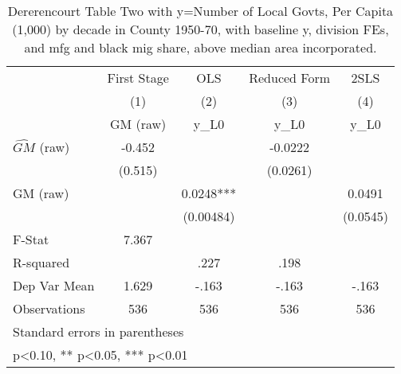 \begin{table}[htbp]\centering
\def\sym#1{\ifmmode^{#1}\else\(^{#1}\)\fi}
\caption{Dererencourt Table Two with y=Number of Local Govts, Per Capita (1,000) by decade in County 1950-70, with baseline y, division FEs, and mfg and black mig share, above median area incorporated.}
\begin{tabular}{l*{4}{c}}
\toprule
                    & First Stage   &         OLS   &Reduced Form   &        2SLS   \\
                    &\multicolumn{1}{c}{(1)}&\multicolumn{1}{c}{(2)}&\multicolumn{1}{c}{(3)}&\multicolumn{1}{c}{(4)}\\
                    &\multicolumn{1}{c}{GM  (raw)}&\multicolumn{1}{c}{y\_L0}&\multicolumn{1}{c}{y\_L0}&\multicolumn{1}{c}{y\_L0}\\
\midrule
$\hat{GM}$ (raw)    &      -0.452   &               &     -0.0222   &               \\
                    &     (0.515)   &               &    (0.0261)   &               \\
\addlinespace
GM  (raw)           &               &      0.0248***&               &      0.0491   \\
                    &               &   (0.00484)   &               &    (0.0545)   \\
\midrule
F-Stat              &       7.367   &               &               &               \\
R-squared           &               &        .227   &        .198   &               \\
Dep Var Mean        &       1.629   &       -.163   &       -.163   &       -.163   \\
Observations        &         536   &         536   &         536   &         536   \\
\bottomrule
\multicolumn{5}{l}{\footnotesize Standard errors in parentheses}\\
\multicolumn{5}{l}{\footnotesize * p<0.10, ** p<0.05, *** p<0.01}\\
\end{tabular}
\end{table}
